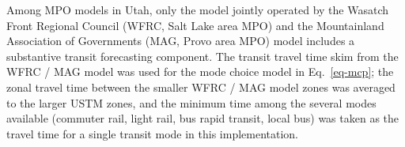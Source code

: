 \documentclass[]{ascelike-new}
\begin{document}
Among MPO models in Utah, only the model jointly operated by the Wasatch
Front Regional Council (WFRC, Salt Lake area MPO) and the Mountainland
Association of Governments (MAG, Provo area MPO) model includes a
substantive transit forecasting component. The transit travel time skim
from the WFRC / MAG model was used for the mode choice model in
Eq.~\ref{eq-mcp}; the zonal travel time between the smaller WFRC / MAG
model zones was averaged to the larger USTM zones, and the minimum time
among the several modes available (commuter rail, light rail, bus rapid
transit, local bus) was taken as the travel time for a single transit
mode in this implementation.

\begin{table}

\caption{\label{tbl-coeffs}Choice Model Coefficients}

\end{table}
\end{document}
